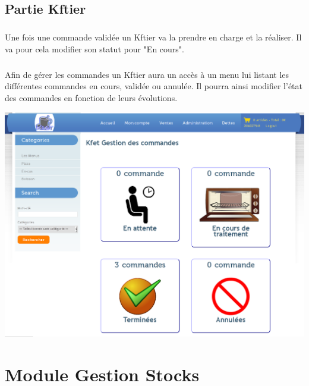 \documentclass[twoside,UTF8]{EPURapport}
\begin{document}
    \section{Partie Kftier}

        \paragraph{}Une fois une commande validée un Kftier va la prendre en charge et la réaliser. Il va pour cela modifier son statut pour "En cours".

        \paragraph{}Afin de gérer les commandes un Kftier aura un accès à un menu lui listant les différentes commandes en cours, validée ou annulée. Il pourra ainsi modifier l'état des commandes en fonction de leurs évolutions.

        \begin{center}
            \includegraphics[width=0.8\linewidth]{logos/gestionCommande.png}
        \end{center}


\chapter{Module Gestion Stocks}

\end{document}
